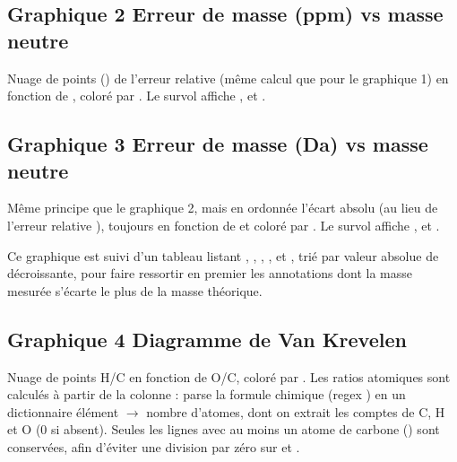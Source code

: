 \documentclass[letterpaper,10pt,english]{sphinxmanual}
\begin{document}
\subsection{Graphique 2 \sphinxhyphen{} Erreur de masse (ppm) vs masse neutre}
\label{\detokenize{2_BacLipidDB:graphique-2-erreur-de-masse-ppm-vs-masse-neutre}}
\sphinxAtStartPar
Nuage de points () de l’erreur relative  (même
calcul que pour le graphique 1) en fonction de , coloré par . Le
survol affiche ,  et .


\subsection{Graphique 3 \sphinxhyphen{} Erreur de masse (Da) vs masse neutre}
\label{\detokenize{2_BacLipidDB:graphique-3-erreur-de-masse-da-vs-masse-neutre}}
\sphinxAtStartPar
Même principe que le graphique 2, mais en ordonnée l’écart absolu  (au lieu de
l’erreur relative ), toujours en fonction de  et coloré par
. Le survol affiche ,  et .

\sphinxAtStartPar
Ce graphique est suivi d’un tableau  listant , ,
, ,  et , trié par valeur
absolue de  décroissante, pour faire ressortir en premier les annotations dont la
masse mesurée s’écarte le plus de la masse théorique.


\subsection{Graphique 4 \sphinxhyphen{} Diagramme de Van Krevelen}
\label{\detokenize{2_BacLipidDB:graphique-4-diagramme-de-van-krevelen}}
\sphinxAtStartPar
Nuage de points H/C en fonction de O/C, coloré par . Les ratios atomiques
sont calculés à partir de la colonne  :  parse la formule
chimique (regex ) en un dictionnaire élément \(\rightarrow\) nombre d’atomes, dont on
extrait les comptes de C, H et O (0 si absent). Seules les lignes avec au moins un atome de
carbone () sont conservées, afin d’éviter une division par zéro sur  et .
\end{document}
